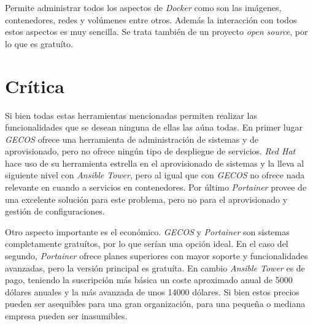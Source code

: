 \begin{itemize}
	Permite administrar todos los aspectos de \textit{Docker} como son las imágenes, contenedores, redes y volúmenes entre otros. Además la interacción con todos estos aspectos es muy sencilla. Se trata también de un proyecto \textit{open source}, por lo que es gratuíto.
\end{itemize}


\section{Crítica}

Si bien todas estas herramientas mencionadas permiten realizar las funcionalidades que se desean ninguna de ellas las aúna todas. En primer lugar \textit{GECOS} ofrece una herramienta de administración de sistemas y de aprovisionado, pero no ofrece ningún tipo de despliegue de servicios. \textit{Red Hat} hace uso de su herramienta estrella en el aprovisionado de sistemas y la lleva al siguiente nivel con \textit{Ansible Tower}, pero al igual que con \textit{GECOS} no ofrece nada relevante en cuando a servicios en contenedores. Por último \textit{Portainer} provee de una excelente solución para este problema, pero no para el aprovisionado y gestión de configuraciones.

\bigskip
Otro aspecto importante es el económico. \textit{GECOS} y \textit{Portainer} son sistemas completamente gratuítos, por lo que serían una opción ideal. En el caso del segundo, \textit{Portainer} ofrece planes superiores con mayor soporte y funcionalidades avanzadas, pero la versión principal es gratuíta. En cambio \textit{Ansible Tower} es de pago, teniendo la suscripción más básica un coste aproximado anual de 5000 dólares anuales y la más avanzada de unos 14000 dólares. Si bien estos precios pueden ser asequibles para una gran organización, para una pequeña o mediana empresa pueden ser inasumibles.